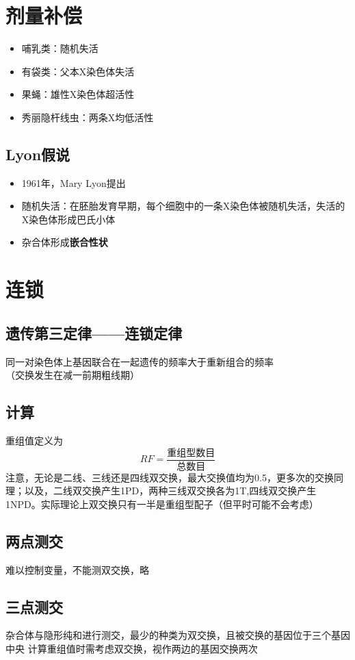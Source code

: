\documentclass[a4paper, 12pt]{report}
\begin{document}
\section{剂量补偿}
\begin{itemize}
    \item 哺乳类：随机失活
    \item 有袋类：父本X染色体失活
    \item 果蝇：雄性X染色体超活性
    \item 秀丽隐杆线虫：两条X均低活性
\end{itemize}
\subsection{Lyon假说}
\begin{itemize}
    \item 1961年，Mary Lyon提出
    \item 随机失活：在胚胎发育早期，每个细胞中的一条X染色体被随机失活，失活的X染色体形成巴氏小体
    \item 杂合体形成\textbf{嵌合性状}
\end{itemize}
\section{连锁}
\subsection{遗传第三定律——连锁定律}
同一对染色体上基因联合在一起遗传的频率大于重新组合的频率\\
（交换发生在减一前期粗线期）
\subsection{计算}
重组值定义为
\[RF=\frac{\text{重组型数目}}{\text{总数目}}\]
注意，无论是二线、三线还是四线双交换，最大交换值均为0.5，更多次的交换同理；以及，二线双交换产生1PD，两种三线双交换各为1T,四线双交换产生1NPD。实际理论上双交换只有一半是重组型配子（但平时可能不会考虑）
\subsection{两点测交}
难以控制变量，不能测双交换，略
\subsection{三点测交}
杂合体与隐形纯和进行测交，最少的种类为双交换，且被交换的基因位于三个基因中央
计算重组值时需考虑双交换，视作两边的基因交换两次
\end{document}
